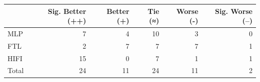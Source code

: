 \begin{tabular}{lrrrrr}
\toprule
 & Sig. Better (++) & Better (+) & Tie (≈) & Worse (-) & Sig. Worse (--) \\
\midrule
MLP & 7 & 4 & 10 & 3 & 0 \\
FTL & 2 & 7 & 7 & 7 & 1 \\
HIFI & 15 & 0 & 7 & 1 & 1 \\
Total & 24 & 11 & 24 & 11 & 2 \\
\bottomrule
\end{tabular}
